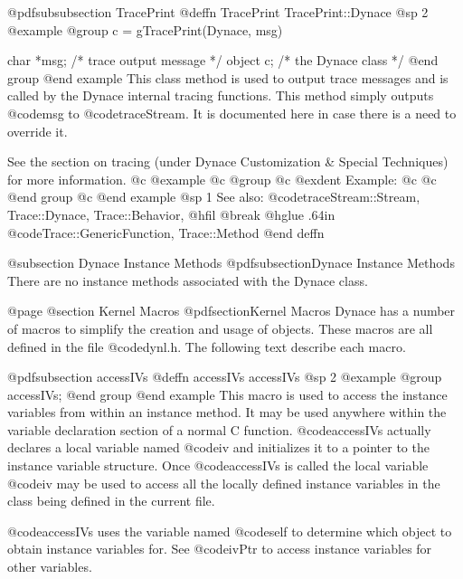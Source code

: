 @pdfsubsubsection {TracePrint}
@deffn {TracePrint} TracePrint::Dynace
@sp 2
@example
@group
c = gTracePrint(Dynace, msg)

char    *msg;   /*  trace output message  */
object  c;      /*  the Dynace class      */
@end group
@end example
This class method is used to output trace messages and is called by
the Dynace internal tracing functions.  This method simply outputs
@code{msg} to @code{traceStream}.  It is documented here in case
there is a need to override it.

See the section on tracing (under Dynace Customization & Special Techniques)
for more information.
@c @example
@c @group
@c @exdent Example:
@c 
@c @end group
@c @end example
@sp 1
See also:  @code{traceStream::Stream, Trace::Dynace, Trace::Behavior,}
@hfil @break @hglue .64in @code{Trace::GenericFunction, Trace::Method}
@end deffn








@subsection Dynace Instance Methods
@pdfsubsection{Dynace Instance Methods}
There are no instance methods associated with the Dynace class.





@page
@section Kernel Macros
@pdfsection{Kernel Macros}
Dynace has a number of macros to simplify the creation and usage of objects.
These macros are all defined in the file @code{dynl.h}.  The following
text describe each macro.











@pdfsubsection {accessIVs}
@deffn {accessIVs} accessIVs
@sp 2
@example
@group
accessIVs;
@end group
@end example
This macro is used to access the instance variables from within an
instance method.  It may be used anywhere within the variable
declaration section of a normal C function.  @code{accessIVs} actually
declares a local variable named @code{iv} and initializes it to a
pointer to the instance variable structure.  Once @code{accessIVs} is
called the local variable @code{iv} may be used to access all the
locally defined instance variables in the class being defined in the
current file.

@code{accessIVs} uses the variable named @code{self} to determine which
object to obtain instance variables for.  See @code{ivPtr} to access
instance variables for other variables.

